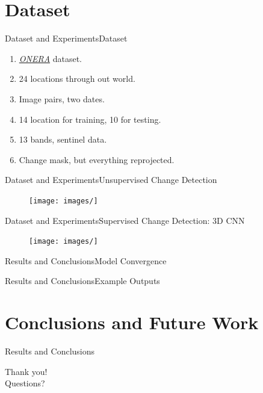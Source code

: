 \documentclass[handout]{beamer}
\begin{document}
\section{Dataset}
\begin{frame}{Dataset and Experiments}{Dataset}
  \begin{enumerate}
    \item \href{https://rcdaudt.github.io/oscd/}{\color{blue}\textit{ONERA}} dataset.
    \item 24 locations through out world.
    \item Image pairs, two dates.
    \item 14 location for training, 10 for testing.
    \item 13 bands, sentinel data.
    \item Change mask, but everything reprojected.
  \end{enumerate}
\end{frame}

\begin{frame}{Dataset and Experiments}{Unsupervised Change Detection}
  \begin{enumerate}

  \end{enumerate}
  \begin{center}
    \begin{figure}
    \texttt{[image: images/]}
    \end{figure}
  \end{center}
\end{frame}

\begin{frame}{Dataset and Experiments}{Supervised Change Detection: 3D CNN}
  \begin{enumerate}

  \end{enumerate}
  \begin{center}
    \begin{figure}
    \texttt{[image: images/]}
    \end{figure}
  \end{center}
\end{frame}


\begin{frame}{Results and Conclusions}{Model Convergence}

\end{frame}

\begin{frame}{Results and Conclusions}{Example Outputs}

\end{frame}

\section{Conclusions and Future Work}
\begin{frame}{Results and Conclusions}{}

\end{frame}

\begin{frame}
\center
\color{blue}
\huge{Thank you!}\\
\huge{Questions?}\\
\end{frame}
\end{document}
